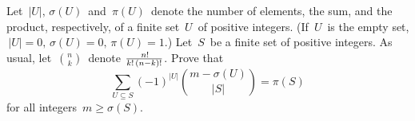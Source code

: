 Let $\, |U|, \, \sigma(U) \,$ and $\, \pi(U) \,$ denote the number of elements, the sum, and the product, respectively, of a finite set $\, U \,$ of positive integers.  (If $\, U \,$ is the empty set, $\, |U| = 0, \, \sigma(U) = 0, \, \pi(U) = 1$.) Let $\, S \,$ be a finite set of positive integers. As usual, let $\, \binom{n}{k} \,$ denote $\, n! \over k! \, (n-k)!$. Prove that \[ \sum_{U \subseteq S} (-1)^{|U|} \binom{m - \sigma(U)}{|S|} = \pi(S)  \] for all integers $\, m \geq \sigma(S)$.